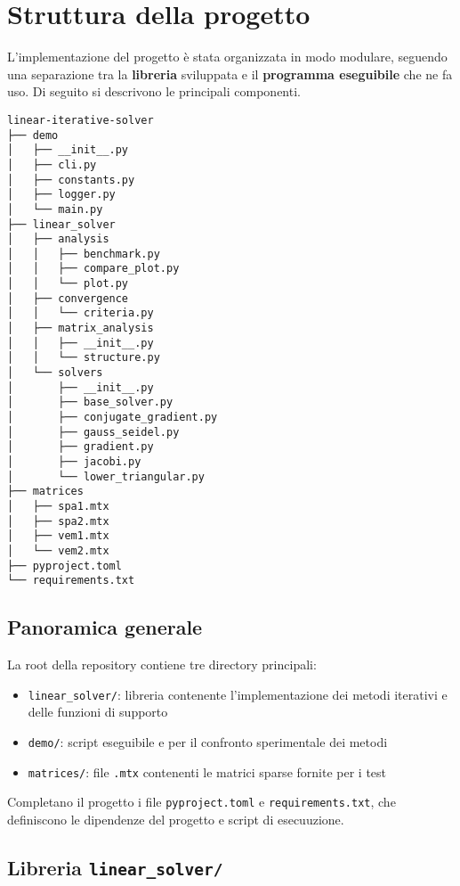 \section{Struttura della progetto}
L’implementazione del progetto è stata organizzata in modo modulare, seguendo una separazione tra la \textbf{libreria} sviluppata e il \textbf{programma eseguibile} che ne fa uso. Di seguito si descrivono le principali componenti.

\begin{footnotesize}
\begin{verbatim}
linear-iterative-solver
├── demo
│   ├── __init__.py
│   ├── cli.py
│   ├── constants.py
│   ├── logger.py
│   └── main.py
├── linear_solver
│   ├── analysis
│   │   ├── benchmark.py
│   │   ├── compare_plot.py
│   │   └── plot.py
│   ├── convergence
│   │   └── criteria.py
│   ├── matrix_analysis
│   │   ├── __init__.py
│   │   └── structure.py
│   └── solvers
│       ├── __init__.py
│       ├── base_solver.py
│       ├── conjugate_gradient.py
│       ├── gauss_seidel.py
│       ├── gradient.py
│       ├── jacobi.py
│       └── lower_triangular.py
├── matrices
│   ├── spa1.mtx
│   ├── spa2.mtx
│   ├── vem1.mtx
│   └── vem2.mtx
├── pyproject.toml
└── requirements.txt
\end{verbatim}
\end{footnotesize}

\subsection{Panoramica generale}

La root della repository contiene tre directory principali:

\begin{itemize}
    \item \texttt{linear\_solver/}: libreria contenente l’implementazione dei metodi iterativi e delle funzioni di supporto
    \item \texttt{demo/}: script eseguibile e per il confronto sperimentale dei metodi
    \item \texttt{matrices/}: file \texttt{.mtx} contenenti le matrici sparse fornite per i test
\end{itemize}

Completano il progetto i file \texttt{pyproject.toml} e \texttt{requirements.txt}, che definiscono le dipendenze del progetto e script di esecuuzione.

\subsection{Libreria \texttt{linear\_solver/}}


